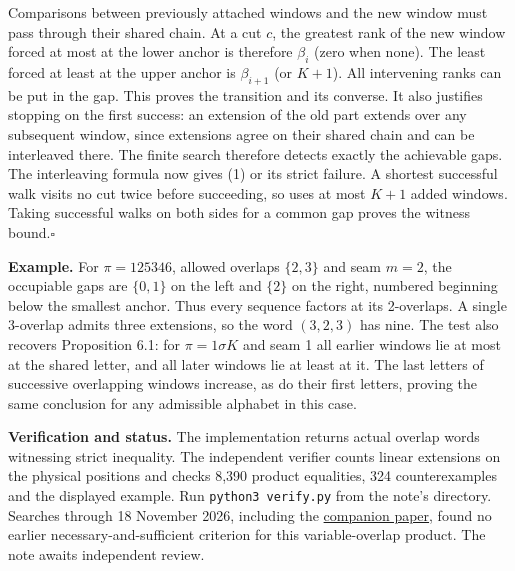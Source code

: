 \documentclass[11pt]{article}
\newcommand{\done}{\hfill\(\square\)}
\begin{document}
Comparisons between previously attached windows and the new window must pass through their shared chain. At a cut $c$, the greatest rank of the new window forced at most at the lower anchor is therefore $\beta_i$ (zero when none). The least forced at least at the upper anchor is $\beta_{i+1}$ (or $K+1$). All intervening ranks can be put in the gap. This proves the transition and its converse. It also justifies stopping on the first success: an extension of the old part extends over any subsequent window, since extensions agree on their shared chain and can be interleaved there. The finite search therefore detects exactly the achievable gaps. The interleaving formula now gives (1) or its strict failure. A shortest successful walk visits no cut twice before succeeding, so uses at most $K+1$ added windows. Taking successful walks on both sides for a common gap proves the witness bound.\done

\textbf{Example.} For $\pi=125346$, allowed overlaps $\{2,3\}$ and seam $m=2$, the occupiable gaps are $\{0,1\}$ on the left and $\{2\}$ on the right, numbered beginning below the smallest anchor. Thus every sequence factors at its 2-overlaps. A single 3-overlap admits three extensions, so the word $(3,2,3)$ has nine. The test also recovers Proposition 6.1: for $\pi=1\sigma K$ and seam 1 all earlier windows lie at most at the shared letter, and all later windows lie at least at it. The last letters of successive overlapping windows increase, as do their first letters, proving the same conclusion for any admissible alphabet in this case.

\small
\textbf{Verification and status.} The implementation returns actual overlap words witnessing strict inequality. The independent verifier counts linear extensions on the physical positions and checks 8,390 product equalities, 324 counterexamples and the displayed example. Run \texttt{python3 verify.py} from the note's directory. Searches through 18 November 2026, including the \href{https://arxiv.org/abs/2611.12829}{companion paper}, found no earlier necessary-and-sufficient criterion for this variable-overlap product. The note awaits independent review.
\end{document}
